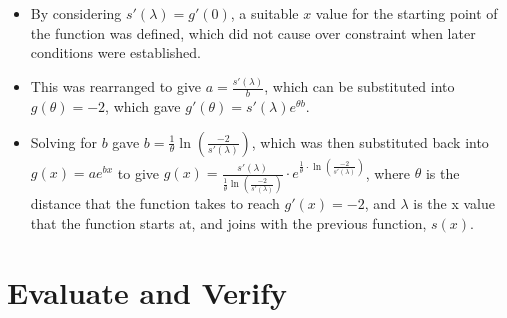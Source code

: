 \documentclass[11pt, letterpaper]{article}
\begin{document}
\begin{itemize}
	\item By considering $s'(\lambda)=g'(0)$, a suitable $x$ value for the starting point of the function was defined, which did not cause over constraint when later conditions were established. 
	\item This was rearranged to give $a=\frac{s'(\lambda)}{b}$, which can be substituted into $g(\theta)=-2$, which gave $g'(\theta)=s'(\lambda)e^{\theta b}$.
		\item Solving for $b$ gave $b=\frac{1}{\theta}\ln(\frac{-2}{s'(\lambda)})$, which was then substituted back into $g(x)=ae^{bx}$ to give $g(x)=\frac{s'(\lambda)}{\frac{1}{\theta}\ln(\frac{-2}{s'(\lambda)})}\cdot e^{\frac{1}{\theta}\cdot \ln (\frac{-2}{s'(\lambda)})}$, where $\theta$ is the distance that the function takes to reach $g'(x)=-2$, and $\lambda$ is the x value that the function starts at, and joins with the previous function, $s(x)$.
	
\end{itemize}






\section{Evaluate and Verify}
\end{document}
